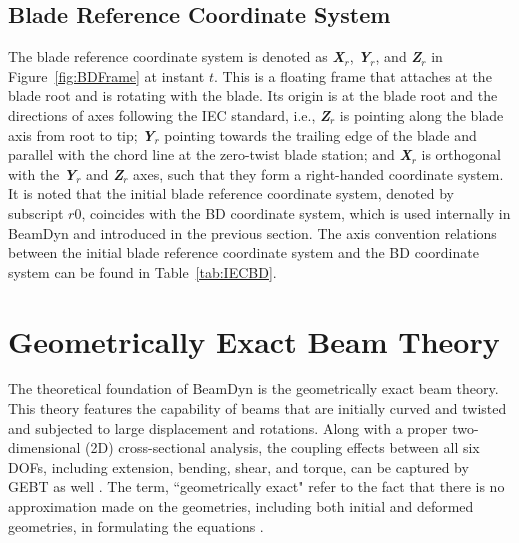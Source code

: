\subsection{Blade Reference Coordinate System}
The blade reference coordinate system is denoted as \textbf{ {\it X$_r$}}, \textbf{ {\it Y$_r$}}, and \textbf{ {\it Z$_r$}} in Figure~\ref{fig:BDFrame} at instant $t$. This is a floating frame that attaches at the blade root and is rotating with the blade. Its origin is at the blade root and the directions of axes following the IEC standard, i.e., \textbf{ {\it Z$_r$}} is pointing along the blade axis from root to tip; \textbf{ {\it Y$_r$}} pointing towards the trailing edge of the blade and parallel with the chord line at the zero-twist blade station; and \textbf{ {\it X$_r$}} is orthogonal with the \textbf{ {\it Y$_r$}} and \textbf{ {\it Z$_r$}} axes, such that they form a right-handed coordinate system. It is noted that the initial blade reference coordinate system, denoted by subscript $r0$, coincides with the BD coordinate system, which is used internally in BeamDyn and introduced in the previous section. The axis convention relations between the initial blade reference coordinate system and the BD coordinate system can be found in Table~\ref{tab:IECBD}. 

\section{Geometrically Exact Beam Theory}
The theoretical foundation of BeamDyn is the geometrically exact beam theory. This theory features the capability of beams that are initially curved and twisted and subjected to large displacement and rotations. Along with a proper two-dimensional (2D) cross-sectional analysis, the coupling effects between all six DOFs, including extension, bending, shear, and torque, can be captured by GEBT as well . The term, ``geometrically exact" refer to the fact that there is no approximation made on the geometries, including both initial and deformed geometries, in formulating the equations \cite{HodgesBeamBook}.    

